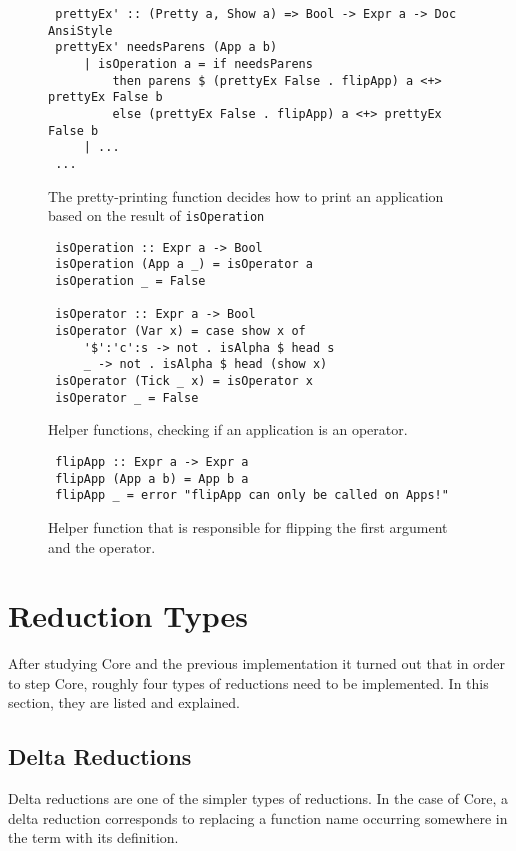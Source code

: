 \begin{figure}[!ht]
\begin{verbatim}
 prettyEx' :: (Pretty a, Show a) => Bool -> Expr a -> Doc AnsiStyle
 prettyEx' needsParens (App a b)
     | isOperation a = if needsParens
         then parens $ (prettyEx False . flipApp) a <+> prettyEx False b
         else (prettyEx False . flipApp) a <+> prettyEx False b
     | ...
 ...
\end{verbatim}
    \caption{The pretty-printing function decides how to print an application based on the result of \texttt{isOperation}}
\end{figure}

\begin{figure}[!ht]
\begin{verbatim}
 isOperation :: Expr a -> Bool
 isOperation (App a _) = isOperator a
 isOperation _ = False
 
 isOperator :: Expr a -> Bool
 isOperator (Var x) = case show x of
     '$':'c':s -> not . isAlpha $ head s
     _ -> not . isAlpha $ head (show x)
 isOperator (Tick _ x) = isOperator x
 isOperator _ = False

\end{verbatim}
    \caption{Helper functions, checking if an application is an operator.}
\end{figure}

\begin{figure}[!ht]
\begin{verbatim}
 flipApp :: Expr a -> Expr a
 flipApp (App a b) = App b a
 flipApp _ = error "flipApp can only be called on Apps!"    
\end{verbatim}
    \caption{Helper function that is responsible for flipping the first argument and the operator.}
\end{figure}

\section{Reduction Types}

After studying Core and the previous implementation it turned out that in order to step Core,
roughly four types of reductions need to be implemented.
In this section, they are listed and explained.

\subsection{Delta Reductions}
Delta reductions are one of the simpler types of reductions.
In the case of Core,
a delta reduction corresponds to replacing a function name occurring somewhere in the term with its definition.

